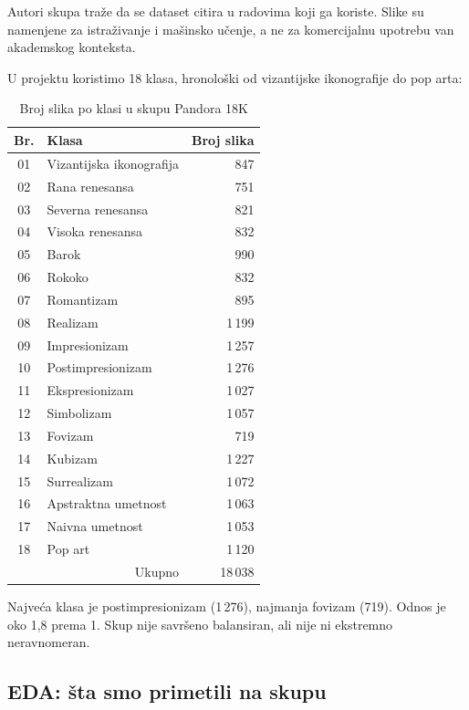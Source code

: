 \documentclass[12pt,a4paper]{article}
\begin{document}
Autori skupa traže da se dataset citira u radovima koji ga koriste.
Slike su namenjene za istraživanje i mašinsko učenje, a ne za komercijalnu upotrebu van akademskog konteksta.

U projektu koristimo 18 klasa, hronološki od vizantijske ikonografije do pop arta:

\begin{table}[htbp]
  \centering
  \caption{Broj slika po klasi u skupu Pandora 18K}
  \label{tab:classes}
  \small
  \begin{tabular}{clr}
    \toprule
    Br. & Klasa & Broj slika \\
    \midrule
    01 & Vizantijska ikonografija & 847 \\
    02 & Rana renesansa & 751 \\
    03 & Severna renesansa & 821 \\
    04 & Visoka renesansa & 832 \\
    05 & Barok & 990 \\
    06 & Rokoko & 832 \\
    07 & Romantizam & 895 \\
    08 & Realizam & 1\,199 \\
    09 & Impresionizam & 1\,257 \\
    10 & Postimpresionizam & 1\,276 \\
    11 & Ekspresionizam & 1\,027 \\
    12 & Simbolizam & 1\,057 \\
    13 & Fovizam & 719 \\
    14 & Kubizam & 1\,227 \\
    15 & Surrealizam & 1\,072 \\
    16 & Apstraktna umetnost & 1\,063 \\
    17 & Naivna umetnost & 1\,053 \\
    18 & Pop art & 1\,120 \\
    \midrule
    \multicolumn{2}{r}{Ukupno} & 18\,038 \\
    \bottomrule
  \end{tabular}
\end{table}

Najveća klasa je postimpresionizam (1\,276), najmanja fovizam (719).
Odnos je oko 1{,}8 prema 1. Skup nije savršeno balansiran, ali nije ni ekstremno neravnomeran.

\subsection{EDA: šta smo primetili na skupu}
\end{document}
